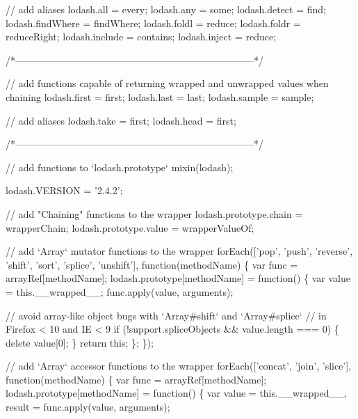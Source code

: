 \begin{DoxyCodeInclude}
{{  \textcolor{comment}{// add aliases}
  lodash.all = every;
  lodash.any = some;
  lodash.detect = find;
  lodash.findWhere = findWhere;
  lodash.foldl = reduce;
  lodash.foldr = reduceRight;
  lodash.include = contains;
  lodash.inject = reduce;

  \textcolor{comment}{/*--------------------------------------------------------------------------*/}

  \textcolor{comment}{// add functions capable of returning wrapped and unwrapped values when chaining}
  lodash.first = first;
  lodash.last = last;
  lodash.sample = sample;

  \textcolor{comment}{// add aliases}
  lodash.take = first;
  lodash.head = first;

  \textcolor{comment}{/*--------------------------------------------------------------------------*/}

  \textcolor{comment}{// add functions to `lodash.prototype`}
  mixin(lodash);

  lodash.VERSION = \textcolor{stringliteral}{'2.4.2'};

  \textcolor{comment}{// add "Chaining" functions to the wrapper}
  lodash.prototype.chain = wrapperChain;
  lodash.prototype.value = wrapperValueOf;

    \textcolor{comment}{// add `Array` mutator functions to the wrapper}
    forEach([\textcolor{stringliteral}{'pop'}, \textcolor{stringliteral}{'push'}, \textcolor{stringliteral}{'reverse'}, \textcolor{stringliteral}{'shift'}, \textcolor{stringliteral}{'sort'}, \textcolor{stringliteral}{'splice'}, \textcolor{stringliteral}{'unshift'}], \textcolor{keyword}{function}(methodName) \{
      var func = arrayRef[methodName];
      lodash.prototype[methodName] = \textcolor{keyword}{function}() \{
        var value = this.\_\_wrapped\_\_;
        func.apply(value, arguments);

        \textcolor{comment}{// avoid array-like object bugs with `Array#shift` and `Array#splice`}
        \textcolor{comment}{// in Firefox < 10 and IE < 9}
        \textcolor{keywordflow}{if} (!support.spliceObjects && value.length === 0) \{
          \textcolor{keyword}{delete} value[0];
        \}
        \textcolor{keywordflow}{return} \textcolor{keyword}{this};
      \};
    \});

    \textcolor{comment}{// add `Array` accessor functions to the wrapper}
    forEach([\textcolor{stringliteral}{'concat'}, \textcolor{stringliteral}{'join'}, \textcolor{stringliteral}{'slice'}], \textcolor{keyword}{function}(methodName) \{
      var func = arrayRef[methodName];
      lodash.prototype[methodName] = \textcolor{keyword}{function}() \{
        var value = this.\_\_wrapped\_\_,
            result = func.apply(value, arguments);

}}
\end{DoxyCodeInclude}
